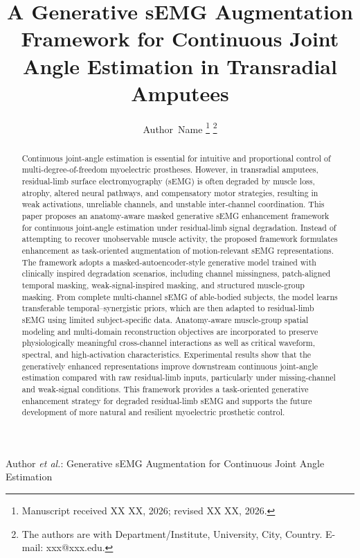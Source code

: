 \documentclass[journal]{IEEEtran}
\begin{document}
\title{A Generative sEMG Augmentation Framework for Continuous Joint Angle Estimation in Transradial Amputees}

\author{Author~Name%
\thanks{Manuscript received XX XX, 2026; revised XX XX, 2026.}%
\thanks{The authors are with Department/Institute, University, City, Country. E-mail: xxx@xxx.edu.}}

%
{Author \MakeLowercase{\textit{et al.}}: Generative sEMG Augmentation for Continuous Joint Angle Estimation}

\maketitle

\begin{abstract}
Continuous joint-angle estimation is essential for intuitive and proportional control of multi-degree-of-freedom myoelectric prostheses. However, in transradial amputees, residual-limb surface electromyography (sEMG) is often degraded by muscle loss, atrophy, altered neural pathways, and compensatory motor strategies, resulting in weak activations, unreliable channels, and unstable inter-channel coordination. This paper proposes an anatomy-aware masked generative sEMG enhancement framework for continuous joint-angle estimation under residual-limb signal degradation. Instead of attempting to recover unobservable muscle activity, the proposed framework formulates enhancement as task-oriented augmentation of motion-relevant sEMG representations. The framework adopts a masked-autoencoder-style generative model trained with clinically inspired degradation scenarios, including channel missingness, patch-aligned temporal masking, weak-signal-inspired masking, and structured muscle-group masking. From complete multi-channel sEMG of able-bodied subjects, the model learns transferable temporal--synergistic priors, which are then adapted to residual-limb sEMG using limited subject-specific data. Anatomy-aware muscle-group spatial modeling and multi-domain reconstruction objectives are incorporated to preserve physiologically meaningful cross-channel interactions as well as critical waveform, spectral, and high-activation characteristics. Experimental results show that the generatively enhanced representations improve downstream continuous joint-angle estimation compared with raw residual-limb inputs, particularly under missing-channel and weak-signal conditions. This framework provides a task-oriented generative enhancement strategy for degraded residual-limb sEMG and supports the future development of more natural and resilient myoelectric prosthetic control.
\end{abstract}
\end{document}
